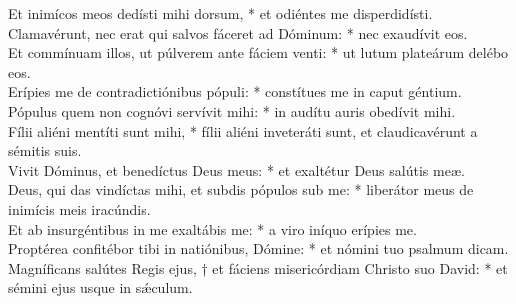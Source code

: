 {	Et inimícos meos dedísti mihi dorsum, * et odiéntes me disperdidísti. \\
	Clamavérunt, nec erat qui salvos fáceret ad Dóminum: * nec exaudívit eos. \\
	Et commínuam illos, ut púlverem ante fáciem venti: * ut lutum plateárum delébo eos. \\
	Erípies me de contradictiónibus pópuli: * constítues me in caput géntium. \\
	Pópulus quem non cognóvi servívit mihi: * in audítu auris obedívit mihi. \\
	Fílii aliéni mentíti sunt mihi, * fílii aliéni inveteráti sunt, et claudicavérunt a sémitis suis. \\
	Vivit Dóminus, et benedíctus Deus meus: * et exaltétur Deus salútis meæ. \\
	Deus, qui das vindíctas mihi, et subdis pópulos sub me: * liberátor meus de inimícis meis iracúndis. \\
	Et ab insurgéntibus in me exaltábis me: * a viro iníquo erípies me. \\
	Proptérea confitébor tibi in natiónibus, Dómine: * et nómini tuo psalmum dicam. \\
	Magníficans salútes Regis ejus, † et fáciens misericórdiam Christo suo David: * et sémini ejus usque in sǽculum. \\
}

